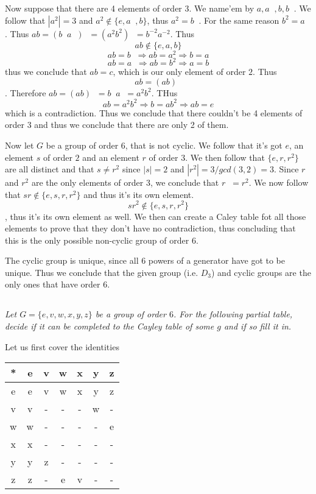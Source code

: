 \documentclass[11pt,oneside,titlepage]{book}
\DeclareMathOperator \inv {^{-1}}
\DeclareMathOperator \ra {\Rightarrow}
\newcommand{\set}[1]{\{ #1 \}}
\begin{document}
Now suppose that there are 4 elements of order 3. We name'em by $a, a\inv, b, b\inv$. We follow
that $|a^2| = 3$ and $a^2 \notin \set{e, a\inv, b}$, thus $a^2 = b\inv$. For the same
reason $b^2 = a\inv$. Thus $ab = (b\inv a\inv)\inv = (a^2 b^2)\inv = b^{-2} a^{-2}$. Thus
$$ab \notin \set{e, a, b}$$
$$ab = b\inv \ra ab = a^2 \ra b = a$$
$$ab = a\inv \ra ab = b^2 \ra a = b$$
thus we conclude that $ab = c$, which is our only element of order $2$. Thus
$$ab = (ab)\inv$$.
Therefore $ab = (ab)\inv = b\inv a\inv = a^2 b^2$. THus
$$ab = a^2 b^2 \ra b = ab^2 \ra ab = e$$
which is a contradiction. Thus we conclude that there couldn't be 4 elements of order 3 and thus
we conclude that there are only 2 of them.

Now let $G$ be a group of order $6$, that is not cyclic. We follow that it's got $e$, an
element $s$ of order $2$ and an element $r$ of order $3$. We then follow that
$\set{e, r, r^2}$ are all distinct and that $s \neq r^2$ since $|s| = 2$ and
$|r^2| = 3/gcd(3, 2) = 3$. Since $r$ and $r^2$ are the only elements of order $3$, we conclude
that $r\inv = r^2$. We now follow that $sr \notin \set{e, s, r, r^2}$ and thus it's its own element.
$$sr^2 \notin \set{e, s, r, r^2}$$, thus it's its own element as well. We then can create
a Caley table fot all those elements to prove that they don't have no contradiction, thus concluding
that this is the only possible non-cyclic group of order $6$.

The cyclic group is unique, since all 6 powers of a generator have got to be unique. Thus we
conclude that the given group (i.e. $D_3$) and cyclic groups are the only ones that have
order $6$.

\subsection{}

\textit{Let $G = \set{e, v, w, x, y, z}$ be a group of order $6$. For the following partial table,
  decide if it can be completed to the Cayley table of some $g$ and if so fill it in.}

Let us first cover the identities

\begin{tabular}[center]{|c|c|c|c|c|c|c|}
  * & e & v & w & x & y & z \\
  \hline
  e & e & v & w & x & y & z \\
  v & v & - & - & - & w & - \\
  w & w & - & - & - & - & e \\
  x & x & - & - & - & - & - \\
  y & y & z & - & - & - & - \\
  z & z & - & e & v & - & - \\
\end{tabular}
\end{document}
